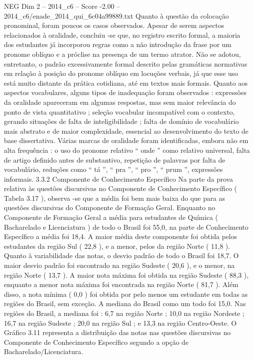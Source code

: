 \begin{textsample}{NEG Dim 2 – 2014\_c6 – Score -2.00 – 2014\_c6/enade\_2014\_qui\_6c04a99889.txt}
Quanto à questão da colocação pronominal, foram poucos os casos observados.
Apesar de serem aspectos relacionados à oralidade, concluiu -se que, no registro escrito formal, a maioria dos estudantes já incorporou regras como a não introdução da frase por um pronome oblíquo e a próclise na presença de um termo atrator.
Não se adotou, entretanto, o padrão excessivamente formal descrito pelas gramáticas normativas em relação à posição do pronome oblíquo em locuções verbais, já que esse uso está muito distante da prática cotidiana, até em textos mais formais.
Quanto aos aspectos vocabulares, alguns tipos de inadequação foram observados : expressões da oralidade apareceram em algumas respostas, mas sem maior relevância do ponto de vista quantitativo ; seleção vocabular incompatível com o contexto, gerando situações de falta de inteligibilidade ; falta de domínio de vocabulário mais abstrato e de maior complexidade, essencial ao desenvolvimento do texto de base dissertativa.
Várias marcas de oralidade foram identificadas, embora não em alta frequência : o uso do pronome relativo “ onde ” como relativo universal, falta de artigo definido antes de substantivo, repetição de palavras por falta de vocabulário, reduções como “ tá ”, “ pra ”, “ pro ”, “ prum ”, expressões informais. 3.3.2 Componente de Conhecimento Específico Na parte da prova relativa às questões discursivas no Componente de Conhecimento Específico ( Tabela 3.17 ), observa -se que a média foi bem mais baixa do que para as questões discursivas do Componente de Formação Geral.
Enquanto no Componente de Formação Geral a média para estudantes de Química ( Bacharelado e Licenciatura ) de todo o Brasil foi 55,0, na parte de Conhecimento Específico a média foi 18,4.
A maior média deste componente foi obtida pelos estudantes da região Sul ( 22,8 ), e a menor, pelos da região Norte ( 11,8 ).
Quanto à variabilidade das notas, o desvio padrão de todo o Brasil foi 18,7.
O maior desvio padrão foi encontrado na região Sudeste ( 20,6 ), e o menor, na região Norte ( 13,7 ).
A maior nota máxima foi obtida na região Sudeste ( 88,3 ), enquanto a menor nota máxima foi encontrada na região Norte ( 81,7 ).
Além disso, a nota mínima ( 0,0 ) foi obtida por pelo menos um estudante em todas as regiões do Brasil, sem exceção.
A mediana do Brasil como um todo foi 15,0.
Nas regiões do Brasil, a mediana foi : 6,7 na região Norte ; 10,0 na região Nordeste ; 16,7 na região Sudeste ; 20,0 na região Sul ; e 13,3 na região Centro-Oeste.
O Gráfico 3.11 representa a distribuição das notas nas questões discursivas no Componente de Conhecimento Específico segundo a opção de Bacharelado/Licenciatura.

\end{textsample}
